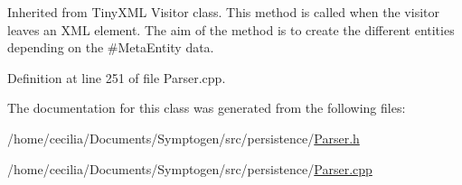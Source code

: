 Inherited from Tiny\-X\-M\-L Visitor class. This method is called when the visitor leaves an X\-M\-L element. The aim of the method is to create the different entities depending on the \#\-Meta\-Entity data. 



Definition at line 251 of file Parser.\-cpp.



The documentation for this class was generated from the following files\-:\begin{DoxyCompactItemize}
\item 
/home/cecilia/\-Documents/\-Symptogen/src/persistence/\hyperlink{_parser_8h}{Parser.\-h}\item 
/home/cecilia/\-Documents/\-Symptogen/src/persistence/\hyperlink{_parser_8cpp}{Parser.\-cpp}\end{DoxyCompactItemize}

